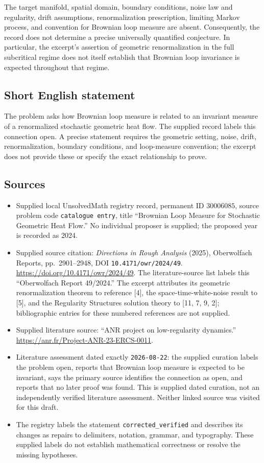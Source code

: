\documentclass[11pt]{article}
\begin{document}
The target manifold, spatial domain, boundary conditions, noise law and regularity, drift assumptions, renormalization prescription, limiting Markov process, and convention for Brownian loop measure are absent. Consequently, the record does not determine a precise universally quantified conjecture. In particular, the excerpt's assertion of geometric renormalization in the full subcritical regime does not itself establish that Brownian loop invariance is expected throughout that regime.
\subsection{Short English statement}
The problem asks how Brownian loop measure is related to an invariant measure of a renormalized stochastic geometric heat flow. The supplied record labels this connection open. A precise statement requires the geometric setting, noise, drift, renormalization, boundary conditions, and loop-measure convention; the excerpt does not provide these or specify the exact relationship to prove.
\subsection{Sources}
\begin{itemize}
\item Supplied local UnsolvedMath registry record, permanent ID \(30006085\), source problem code \texttt{catalogue entry}, title ``Brownian Loop Measure for Stochastic Geometric Heat Flow.'' No individual proposer is supplied; the proposed year is recorded as 2024.
\item Supplied source citation: \emph{Directions in Rough Analysis} (2025), Oberwolfach Reports, pp.\ 2901--2948, DOI \texttt{10.4171/owr/2024/49}. \url{https://doi.org/10.4171/owr/2024/49}. The literature-source list labels this ``Oberwolfach Report 49/2024.'' The excerpt attributes its geometric renormalization theorem to reference [4], the space-time-white-noise result to [5], and the Regularity Structures solution theory to [11, 7, 9, 2]; bibliographic entries for these numbered references are not supplied.
\item Supplied literature source: ``ANR project on low-regularity dynamics.'' \url{https://anr.fr/Project-ANR-23-ERCS-0011}.
\item Literature assessment dated exactly \texttt{2026-08-22}: the supplied curation labels the problem open, reports that Brownian loop measure is expected to be invariant, says the primary source identifies the connection as open, and reports that no later proof was found. This is supplied dated curation, not an independently verified literature assessment. Neither linked source was visited for this draft.
\item The registry labels the statement \texttt{corrected\_verified} and describes its changes as repairs to delimiters, notation, grammar, and typography. These supplied labels do not establish mathematical correctness or resolve the missing hypotheses.
\end{itemize}
\end{document}
